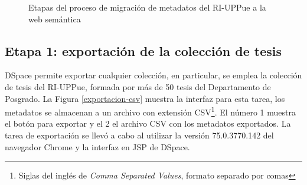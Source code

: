 \begin{figure}[!ht]
	\centering
    \caption{Etapas del proceso de migraci\'on de metadatos del RI-UPPue a la web sem\'antica} %
    \label{etapasMigracion}
\end{figure}

\subsection{Etapa 1: exportaci\'on de la colecci\'on de tesis}

DSpace permite exportar cualquier colecci\'on, en particular, se emplea la colecci\'on de tesis del RI-UPPue, formada por m\'as de  50 tesis del Departamento de Posgrado. La Figura \ref{exportacion-csv} muestra la interfaz para esta tarea, los metadatos se almacenan a un archivo con extensi\'on CSV\footnote{Siglas del ingl\'es de \emph{Comma Separated Values}, formato separado por comas}. El n\'umero 1 muestra el bot\'on para exportar y el 2 el archivo CSV con los metadatos exportados. La tarea de exportaci\'on se llev\'o a cabo al utilizar la versi\'on 75.0.3770.142 del navegador Chrome y la interfaz en JSP de DSpace.

